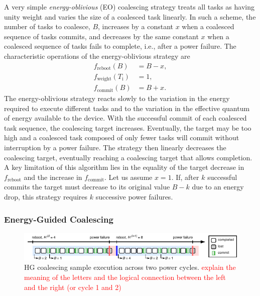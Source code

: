A very simple {\em energy-oblivious} (EO) coalescing strategy treats all tasks as having unity weight and varies the size of a coalesced task linearly. In such a scheme, the number of tasks to coalesce, $B$, increases by a constant $x$ when a coalesced sequence of tasks commits, and decreases by the same constant $x$ when a coalesced sequence of tasks fails to complete, i.e., after a power failure. The characteristic operations of the energy-oblivious strategy are
%
\begin{equation}
	\begin{split}
		f_\text{reboot}(B) & = B - x, \\
		f_\text{weight}(T_\text{i}) & =  1, \\
		f_\text{commit}(B) & = B + x.
	\end{split}
\end{equation}
%
The energy-oblivious strategy reacts slowly to the variation in the energy required to execute different tasks and to the variation in the effective quantum of energy available to the device. With the successful commit of each coalesced task sequence, the coalescing target increases. Eventually, the target may be too high and a coalesced task composed of only fewer tasks will commit without interruption by a power failure. The strategy then linearly decreases the coalescing target, eventually reaching a coalescing target that allows completion. A key limitation of this algorithm lies in the equality of the target decrease in $f_\text{reboot}$ and the increase in $f_\text{commit}$. Let us assume $x=1$. If, after $k$ successful commits the target must decrease to its original value $B-k$ due to an energy drop, this strategy requires $k$ successive power failures.

\subsubsection{Energy-Guided Coalescing}
\label{subsec:energyAware}

\begin{figure}
    \includegraphics[width=\linewidth]{figures/hg-coal-horiz.pdf}
    \caption{HG coalescing sample execution across two power cycles. \textcolor{red}{explain the meaning of the letters and the logical connection between the left and the right (or cycle 1 and 2)}}
    \label{fig:hg-coal}
\end{figure}


